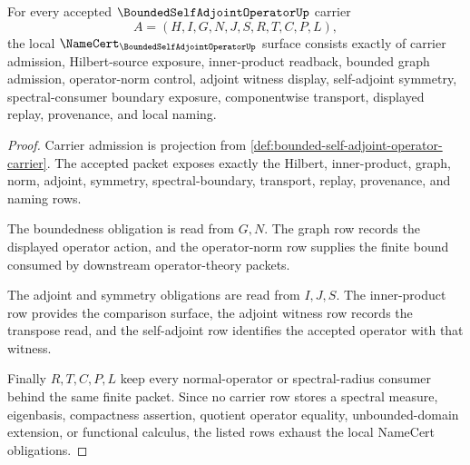 \begin{theorem}
\label{thm:bounded-self-adjoint-operator-namecert-obligations}
For every accepted $\BoundedSelfAdjointOperatorUp$ carrier
$$
A=(H,I,G,N,J,S,R,T,C,P,L),
$$
the local $\NameCert_{\BoundedSelfAdjointOperatorUp}$ surface consists exactly of carrier admission, Hilbert-source exposure, inner-product readback, bounded graph admission, operator-norm control, adjoint witness display, self-adjoint symmetry, spectral-consumer boundary exposure, componentwise transport, displayed replay, provenance, and local naming.
\end{theorem}
\begin{proof}
Carrier admission is projection from \autoref{def:bounded-self-adjoint-operator-carrier}. The accepted packet exposes exactly the Hilbert, inner-product, graph, norm, adjoint, symmetry, spectral-boundary, transport, replay, provenance, and naming rows.

The boundedness obligation is read from $G,N$. The graph row records the displayed operator action, and the operator-norm row supplies the finite bound consumed by downstream operator-theory packets.

The adjoint and symmetry obligations are read from $I,J,S$. The inner-product row provides the comparison surface, the adjoint witness row records the transpose read, and the self-adjoint row identifies the accepted operator with that witness.

Finally $R,T,C,P,L$ keep every normal-operator or spectral-radius consumer behind the same finite packet. Since no carrier row stores a spectral measure, eigenbasis, compactness assertion, quotient operator equality, unbounded-domain extension, or functional calculus, the listed rows exhaust the local NameCert obligations.
\end{proof}

